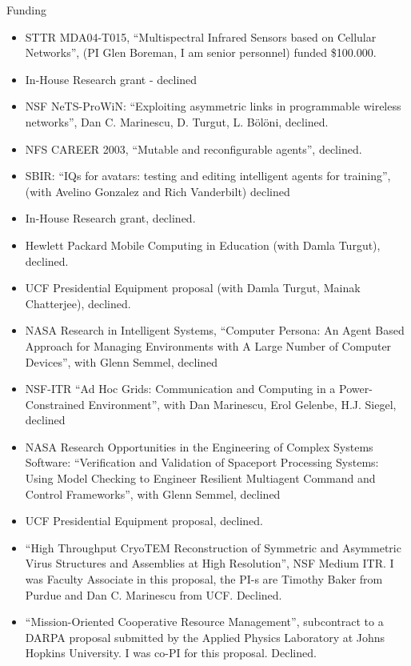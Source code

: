 \begin{category}{Funding}
\begin{itemize}
\item STTR MDA04-T015, ``Multispectral Infrared Sensors based on Cellular
Networks'', (PI Glen Boreman, I am senior personnel) funded \$100.000.
\item In-House Research grant - declined
\item NSF NeTS-ProWiN: ``Exploiting asymmetric links in programmable wireless
networks'', Dan C. Marinescu, D. Turgut, L. B{\"o}l{\"o}ni, declined. 
\end{itemize}


\begin{itemize}
\item NFS CAREER 2003, ``Mutable and reconfigurable agents'', declined.
\item SBIR:  ``IQs for avatars: testing and editing intelligent agents for
training'', (with Avelino Gonzalez and Rich Vanderbilt) declined
\item In-House Research grant, declined. 
\item Hewlett Packard Mobile Computing in Education (with Damla Turgut),
declined. 
\item UCF Presidential Equipment proposal (with Damla Turgut, Mainak
Chatterjee), declined. 
\item NASA Research in Intelligent Systems, ``Computer Persona: An Agent Based
Approach for Managing Environments with A Large Number of Computer Devices'',
with Glenn Semmel, declined
\end{itemize}

\begin{itemize}
\item NSF-ITR ``Ad Hoc Grids: Communication and Computing in a Power-Constrained
Environment'', with Dan Marinescu, Erol Gelenbe, H.J. Siegel, declined
\item NASA Research Opportunities in the Engineering of Complex Systems
Software: ``Verification and Validation of Spaceport Processing Systems: Using
Model Checking to Engineer Resilient Multiagent Command and Control
Frameworks'',
with Glenn Semmel, declined
\item UCF Presidential Equipment proposal, declined.
\item ``High Throughput
CryoTEM  Reconstruction of Symmetric and Asymmetric Virus Structures and
Assemblies at High Resolution'', NSF Medium ITR. I was Faculty Associate in this
proposal, the PI-s are Timothy Baker from Purdue and Dan C. Marinescu from UCF.
Declined.
\item ``Mission-Oriented Cooperative Resource Management'', subcontract to a
DARPA proposal submitted by the Applied Physics Laboratory at Johns Hopkins
University. I was co-PI for this proposal. Declined.
\end{itemize}

\end{category}